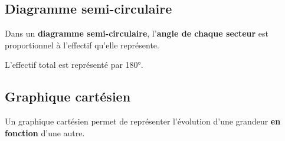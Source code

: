 \subsection{Diagramme semi-circulaire}
\begin{minipage}{0.8\linewidth}
   \begin{definition}
   Dans un \textbf{diagramme semi-circulaire}, l'\textbf{angle de chaque secteur} est proportionnel à l'effectif qu'elle repr\'esente.
   \par
   L'effectif total est représenté par \ang{180}.
   \end{definition}
\end{minipage}
\hspace*{-15mm}
\begin{minipage}{0.2\linewidth}
   \begin{center}
   \end{center}
\end{minipage}
   
\subsection{Graphique cartésien}
\begin{definition}
Un graphique cart\'esien permet de repr\'esenter l'\'evolution d'une grandeur \textbf{en fonction} d'une autre.
\end{definition}
\begin{exemple*1}

   \begin{center}      
   \end{center}
\end{exemple*1}